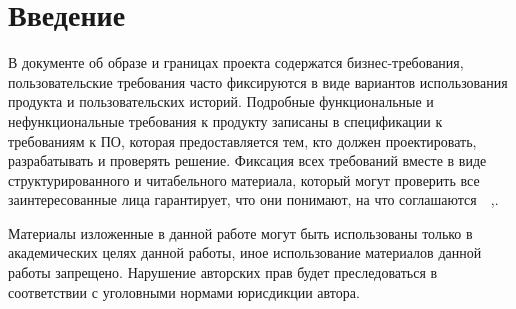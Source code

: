 \chapter*{Введение}
\label{ch:intro}

В документе об образе и границах проекта содержатся бизнес-требования, пользовательские требования часто фиксируются в
виде вариантов использования продукта и пользовательских историй.
Подробные функциональные и нефункциональные требования к продукту записаны в спецификации к требованиям к ПО,
которая предоставляется тем, кто должен проектировать, разрабатывать и проверять решение.
Фиксация всех требований вместе в виде структурированного и читабельного материала, который могут проверить
все заинтересованные лица гарантирует, что они понимают, на что соглашаются~\cite{vigers,vigersRu}~,.

Материалы изложенные в данной работе могут быть использованы только в академических целях данной работы,
иное использование материалов данной работы запрещено.
Нарушение авторских прав будет преследоваться в соответствии с уголовными нормами юрисдикции автора.
\endinput
